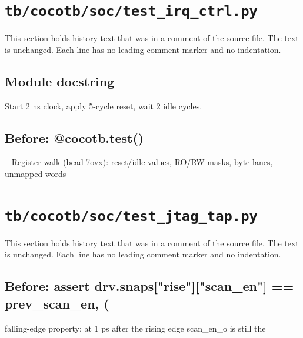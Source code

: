\section{\texttt{tb/cocotb/soc/test\_irq\_ctrl.py}}\label{cr:suite:soc-test-irq-ctrl}

This section holds history text that was in a comment of the source file. The text is unchanged. Each line has no leading comment marker and no indentation.

\begin{record}

\subsection*{Module docstring}

\begin{textblock}
Start 2 ns clock, apply 5-cycle reset, wait 2 idle cycles.
\end{textblock}

\subsection*{Before: @cocotb.test()}

\begin{textblock}
-- Register walk (bead 7ovx): reset/idle values, RO/RW masks, byte lanes, unmapped words ------
\end{textblock}

\end{record}

\section{\texttt{tb/cocotb/soc/test\_jtag\_tap.py}}\label{cr:suite:soc-test-jtag-tap}

This section holds history text that was in a comment of the source file. The text is unchanged. Each line has no leading comment marker and no indentation.

\begin{record}

\subsection*{Before: assert drv.snaps["rise"]["scan\_en"] == prev\_scan\_en, (}

\begin{textblock}
falling-edge property: at 1 ps after the rising edge scan_en_o is still the
\end{textblock}

\end{record}


